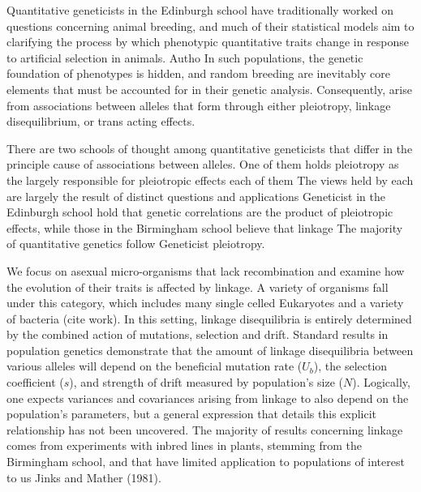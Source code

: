 \documentclass[11pt,one column]{article}
\begin{document}
\begin{multicols}{2}
Quantitative geneticists in the Edinburgh school have traditionally worked on questions concerning animal breeding, and much of their statistical models aim to clarifying the process by which phenotypic quantitative traits change in response to artificial selection in animals.  Autho
In such populations, the genetic foundation of phenotypes is hidden, and random breeding are inevitably core elements that must be accounted for in their genetic analysis.  Consequently, arise from associations between alleles that form through either pleiotropy, linkage disequilibrium, or trans acting effects.\par

There are two schools of thought among quantitative geneticists that differ in the principle cause of associations between alleles.  One of them holds pleiotropy as the largely responsible for  pleiotropic effects each of them The views held by each are largely the result of distinct questions and applications Geneticist in the Edinburgh school hold that genetic correlations are the product of pleiotropic effects, while those in the Birmingham school believe that linkage The majority of quantitative genetics follow Geneticist pleiotropy.\par

We focus on asexual micro-organisms that lack recombination and examine how the evolution of their traits is affected by linkage. A variety of organisms fall under this category, which includes many single celled Eukaryotes and a variety of bacteria (cite work). In this setting, linkage disequilibria is entirely determined by the combined action of mutations, selection and drift. Standard results in population genetics demonstrate that the amount of linkage disequilibria between various alleles will depend on the beneficial mutation rate ($U_b$), the selection coefficient ($s$), and strength of drift measured by population’s size ($N$). Logically, one expects variances and covariances arising from linkage to also depend on the population’s parameters, but a general expression that details this explicit relationship has not been uncovered. The majority of results concerning linkage comes from experiments with inbred lines in plants, stemming from the Birmingham school, and that have limited application to populations of interest to us Jinks and Mather (1981).\par


\end{multicols}
\end{document}

